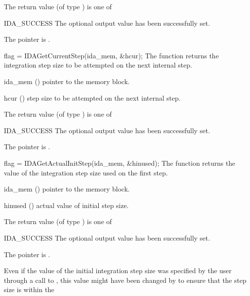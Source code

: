 {{\begin{args}
  \end{args}
}
{
  The return value  (of type ) is one of
  \begin{args}
  \item[IDA\_SUCCESS]
    The optional output value has been successfully set.
  \item[\Id{IDA\_MEM\_NULL}]
    The  pointer is .
  \end{args}
}
{}
{
  flag = IDAGetCurrentStep(ida\_mem, \&hcur);
}
{
  The function  returns the
  integration step size to be attempted on the next internal step.
}
{
  \begin{args}
  \item[ida\_mem] ()
    pointer to the {\ida} memory block.
  \item[hcur] ()
    step size to be attempted on the next internal step.
  \end{args}
}
{
  The return value  (of type ) is one of
  \begin{args}
  \item[IDA\_SUCCESS]
    The optional output value has been successfully set.
  \item[\Id{IDA\_MEM\_NULL}]
    The  pointer is .
  \end{args}
}
{}
{
  flag = IDAGetActualInitStep(ida\_mem, \&hinused);
}
{
  The function  returns the
  value of the integration step size used on the first step.
}
{
  \begin{args}
  \item[ida\_mem] ()
    pointer to the {\ida} memory block.
  \item[hinused] ()
    actual value of initial step size.
  \end{args}
}
{
  The return value  (of type ) is one of
  \begin{args}
  \item[IDA\_SUCCESS]
    The optional output value has been successfully set.
  \item[\Id{IDA\_MEM\_NULL}]
    The  pointer is .
  \end{args}
}
{
  Even if the value of the initial integration step size was specified
  by the user through a call to , this value might have
  been changed by {\ida} to ensure that the step size is within the
}}
